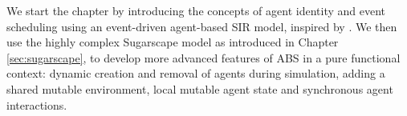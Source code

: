 \medskip

We start the chapter by introducing the concepts of agent identity and event scheduling using an event-driven agent-based SIR model, inspired by \cite{macal_agent-based_2010}. We then use the highly complex Sugarscape model as introduced in Chapter \ref{sec:sugarscape}, to develop more advanced features of ABS in a pure functional context: dynamic creation and removal of agents during simulation, adding a shared mutable environment, local mutable agent state and synchronous agent interactions. 





%

%

